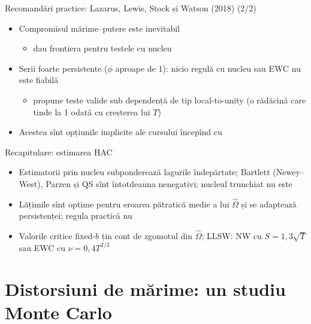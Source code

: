 \begin{frame}{Recomandări practice: Lazarus, Lewis, Stock și Watson (2018) (2/2)}
\itemsize{\small}
\begin{itemize}
    \item Compromisul mărime--putere este inevitabil
    \begin{itemize}
        \item {} dau frontiera pentru testele cu nucleu
    \end{itemize}
    \item Serii foarte persistente ($\phi$ aproape de 1): nicio regulă cu nucleu sau EWC nu este fiabilă
    \begin{itemize}
        \item {} propune teste valide sub dependență de tip local-to-unity (o rădăcină care tinde la 1 odată cu creșterea lui $T$)
    \end{itemize}
    \item Acestea sînt opțiunile implicite ale cursului începînd cu 
\end{itemize}
\end{frame}

\begin{frame}{Recapitulare: estimarea HAC}
\itemsize{\small}
\begin{itemize}
    \item Estimatorii prin nucleu subponderează lagurile îndepărtate; Bartlett (Newey--West), Parzen și QS sînt întotdeauna nenegativi; nucleul trunchiat nu este
    \item Lățimile  sînt optime pentru eroarea pătratică medie a lui $\hat\Omega$ și se adaptează persistenței; regula practică nu
    \item Valorile critice fixed-$b$ țin cont de zgomotul din $\hat\Omega$; LLSW: NW cu $S = 1{,}3\sqrt{T}$ sau EWC cu $\nu = 0{,}4T^{2/3}$
\end{itemize}
\end{frame}


\section{Distorsiuni de mărime: un studiu Monte Carlo}

